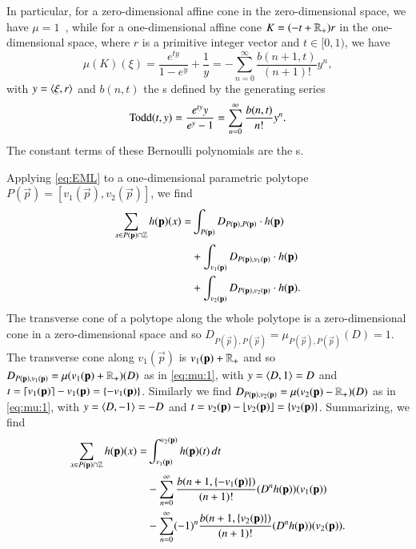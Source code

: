 In particular, for a zero-dimensional affine cone in the zero-dimensional
space, we have $\mu = 1$~\cite[Proposition 12]{Berline2006local},
while for a one-dimensional affine
cone $K = (-t + \mathbb{R}_+) r$ in the one-dimensional space, where
$r$ is a primitive integer vector and $t \in [0,1)$,
we have~\cite[(13)]{Berline2006local}
\begin{equation}
\label{eq:mu:1}
\mu(K)(\xi) = \frac{e^{t y}}{1-e^y} + \frac 1{y}
= -\sum_{n=0}^\infty \frac{b(n+1, t)}{(n+1)!} y^n
,
\end{equation}
with $y = \langle \xi, r\rangle$ and $b(n,t)$ the s
defined by the generating series
\begin{equation}
\label{eq:bernoulli}
\Todd(t,y) =
\frac{e^{ty} y}{e^y - 1} = \sum_{n=0}^\infty \frac{b(n,t)}{n!} y^n
.
\end{equation}
The constant terms of these Bernoulli polynomials
are the s.

Applying \eqref{eq:EML} to a one-dimensional parametric polytope
$P(\vec p) = [v_1(\vec p), v_2(\vec p)]$, we find
$$
\begin{aligned}
\sum_{x \in P(\vec p) \cap \ZZ} h(\vec p)(x)
= & \int_{P(\vec p)} D_{P(\vec p), P(\vec p)} \cdot h(\vec p)
\\
& + \int_{v_1(\vec p)} D_{P(\vec p), v_1(\vec p)} \cdot h(\vec p)
\\
& + \int_{v_2(\vec p)} D_{P(\vec p), v_2(\vec p)} \cdot h(\vec p)
.
\end{aligned}
$$
The transverse cone of a polytope along the whole polytope is
a zero-dimensional cone in a zero-dimensional space and so
$D_{P(\vec p), P(\vec p)} = \mu_{P(\vec p), P(\vec p)}(D) = 1$.
The transverse cone along $v_1(\vec p)$ is $v_1(\vec p) + \RR_+$
and so $D_{P(\vec p), v_1(\vec p)} = \mu(v_1(\vec p) + \RR_+)(D)$
as in \eqref{eq:mu:1}, with $y = \langle D, 1\rangle = D$ and
$t = \ceil{v_1(\vec p)} - v_1(\vec p) =
\fractional{-v_1(\vec p)}$.
Similarly we find
$D_{P(\vec p), v_2(\vec p)} = \mu(v_2(\vec p) - \RR_+)(D)$
as in \eqref{eq:mu:1}, with $y = \langle D, -1\rangle = -D$ and
$t = v_2(\vec p) - \floor{v_2(\vec p)} =
\fractional{v_2(\vec p)}$.
Summarizing, we find
$$
\begin{aligned}
\sum_{x \in P(\vec p) \cap \ZZ} h(\vec p)(x)
= & \int_{v_1(\vec p)}^{v_2(\vec p)} h(\vec p)(t) \, dt
\\
& -\sum_{n=0}^\infty \frac{b(n+1, \fractional{-v_1(\vec p)})}{(n+1)!}
	(D^n h(\vec p))(v_1(\vec p))
\\
& -\sum_{n=0}^\infty (-1)^n \frac{b(n+1, \fractional{v_2(\vec p)})}{(n+1)!}
	(D^n h(\vec p))(v_2(\vec p))
.
\end{aligned}
$$

